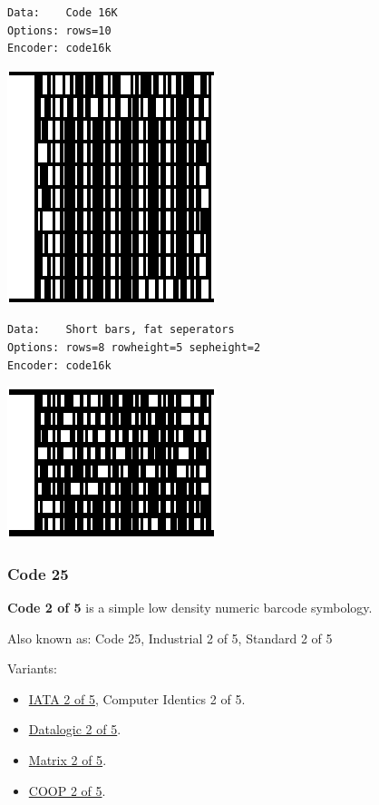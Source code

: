 \begin{verbatim}
Data:    Code 16K
Options: rows=10
Encoder: code16k
\end{verbatim}

\includegraphics{images/code16k-2.eps}

\begin{verbatim}
Data:    Short bars, fat seperators
Options: rows=8 rowheight=5 sepheight=2
Encoder: code16k
\end{verbatim}

\includegraphics{images/code16k-3.eps}

\hypertarget{code-25}{%
\subsubsection{Code 25}\label{code-25}}

\textbf{Code 2 of 5} is a simple low density numeric barcode symbology.

Also known as: Code 25, Industrial 2 of 5, Standard 2 of 5

Variants:

\begin{itemize}
\tightlist
\item
  \protect\hyperlink{iata-2-of-5}{IATA 2 of 5}, Computer Identics 2 of
  5.
\item
  \protect\hyperlink{datalogic-2-of-5}{Datalogic 2 of 5}.
\item
  \protect\hyperlink{matrix-2-of-5}{Matrix 2 of 5}.
\item
  \protect\hyperlink{coop-2-of-5}{COOP 2 of 5}.
\end{itemize}


